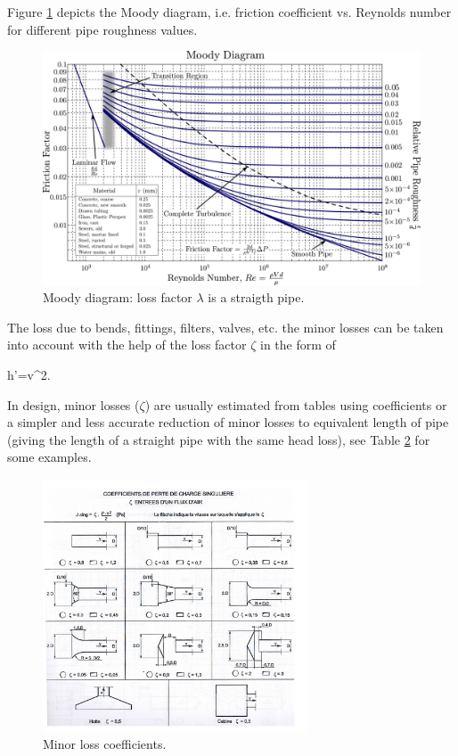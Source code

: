 Figure \ref{fig:moody} depicts the Moody diagram, i.e. friction coefficient vs. Reynolds number for different pipe roughness values.

\begin{figure}[ht]
\centering
\includegraphics[width=\textwidth]{figs/moody.png}
\caption{\label{fig:moody}Moody diagram: loss factor $\lambda$ is a straigth pipe.}
\end{figure} 

The loss due to bends, fittings, filters, valves, etc. the minor losses can be taken into account with the help of the loss factor $\zeta$ in the form of

\beq
h'=\zeta{}v^2.
\eeq

In design, minor losses ($\zeta$) are usually estimated from tables using coefficients or a simpler and less accurate reduction of minor losses to equivalent length of pipe (giving the length of a straight pipe with the same head loss), see Table \ref{fig:minor_loss_coeffs} for some examples.

\begin{figure}[ht]
\centering
\includegraphics[width=0.7\textwidth]{figs/abaque-perte-charge.jpg}
\caption{\label{fig:minor_loss_coeffs}Minor loss coefficients.}
\end{figure} 

